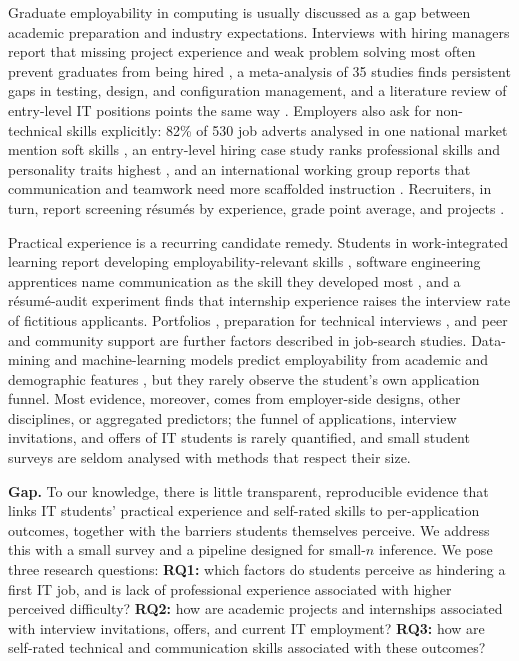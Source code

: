 \documentclass[conference]{IEEEtran}
\begin{document}
Graduate employability in computing is usually discussed as a gap between academic preparation and industry expectations. Interviews with hiring managers report that missing project experience and weak problem solving most often prevent graduates from being hired \cite{radermacher2014}, a meta-analysis of 35 studies finds persistent gaps in testing, design, and configuration management, and a literature review of entry-level IT positions points the same way \cite{ngoye2021}. Employers also ask for non-technical skills explicitly: 82\% of 530 job adverts analysed in one national market mention soft skills \cite{galster2022}, an entry-level hiring case study ranks professional skills and personality traits highest \cite{stamm2023}, and an international working group reports that communication and teamwork need more scaffolded instruction \cite{garcia2025}. Recruiters, in turn, report screening r\'esum\'es by experience, grade point average, and projects \cite{stepanova2021}.

Practical experience is a recurring candidate remedy. Students in work-integrated learning report developing employability-relevant skills \cite{agwaEjon2017}, software engineering apprentices name communication as the skill they developed most \cite{barr2022}, and a r\'esum\'e-audit experiment finds that internship experience raises the interview rate of fictitious applicants. Portfolios \cite{tasji2023}, preparation for technical interviews \cite{bell2025}, and peer and community support \cite{lunn2024} are further factors described in job-search studies. Data-mining and machine-learning models predict employability from academic and demographic features \cite{mishra2016,singh2023,alheadary2023}, but they rarely observe the student's own application funnel. Most evidence, moreover, comes from employer-side designs, other disciplines, or aggregated predictors; the funnel of applications, interview invitations, and offers of IT students is rarely quantified, and small student surveys are seldom analysed with methods that respect their size.

\textbf{Gap.} To our knowledge, there is little transparent, reproducible evidence that links IT students' practical experience and self-rated skills to per-application outcomes, together with the barriers students themselves perceive. We address this with a small survey and a pipeline designed for small-$n$ inference. We pose three research questions:
\textbf{RQ1:} which factors do students perceive as hindering a first IT job, and is lack of professional experience associated with higher perceived difficulty?
\textbf{RQ2:} how are academic projects and internships associated with interview invitations, offers, and current IT employment?
\textbf{RQ3:} how are self-rated technical and communication skills associated with these outcomes?
\end{document}
